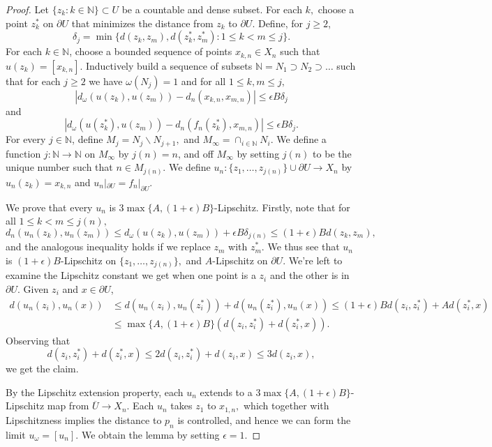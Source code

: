 \documentclass[10pt]{amsart}
\theoremstyle{definition}
\begin{document}
\begin{proof}
  Let $\{z_k:k\in \mathbb{N}\}\subset U$ be a countable and dense subset. For each $k,$ choose a point $z_k^*$ on $\partial U$ that minimizes the distance from $z_k$ to $\partial U$. Define, for $j\geq 2$, $$\delta_j = \min \{d(z_k,z_m), d(z_k^*,z_m^*):1\leq k < m \leq j\}.$$ For each $k\in \mathbb{N}$, choose a bounded sequence of points $x_{k,n}\in X_n$ such that $u(z_k)=[x_{k,n}]$. Inductively build a sequence of subsets $\mathbb{N}=N_1\supset N_2\supset\dots $ such that for each $j\geq 2$ we have $\omega(N_j)=1$ and for all $1\leq k,m\leq j,$ $$|d_\omega(u(z_k),u(z_m))-d_n(x_{k,n},x_{m,n})|\leq \epsilon B\delta_j$$ and $$|d_\omega(u(z_k^*),u(z_m))-d_n(f_n(z_k^*),x_{m,n})|\leq \epsilon B\delta_j.$$ For every $j\in\mathbb{N}$, define $M_j=N_j\backslash N_{j+1},$ and $M_\infty=\cap_{i\in\mathbb{N}}N_i.$ We define a function $j:\mathbb{N}\to \mathbb{N}$ on $M_\infty$ by $j(n)=n$, and off $M_\infty$ by setting $j(n)$ to be the unique number such that $n\in M_{j(n)}.$ We define $u_n:\{z_1,\dots, z_{j(n)}\}\cup\partial U\to X_n$ by $u_n(z_k)=x_{k,n}$ and $u_n|_{\partial U}=f_n|_{\partial U}$.
  
  We prove that every $u_n$ is $3\max\{A,(1+\epsilon)B\}$-Lipschitz. Firstly, note that for all $1\leq k <m\leq j(n),$ $$d_n(u_n(z_k),u_n(z_m))\leq d_\omega(u(z_k),u(z_m))+\epsilon B \delta_{j(n)}\leq (1+\epsilon)Bd(z_k,z_m),$$ and the analogous inequality holds if we replace $z_m$ with $z_m^*.$ We thus see that $u_n$ is $(1+\epsilon)B$-Lipschitz on $\{z_1,\dots, z_{j(n)}\},$ and $A$-Lipschitz on $\partial U$. We're left to examine the Lipschitz constant we get when one point is a $z_i$ and the other is in $\partial U$. Given $z_i$ and $x\in \partial U$, 
  \begin{align*}
      d(u_n(z_i),u_n(x))&\leq d(u_n(z_i),u_n(z_i^*))+d(u_n(z_i^*),u_n(x))\leq (1+\epsilon)Bd(z_i,z_i^*) + Ad(z_i^*,x) \\
      &\leq \max\{A,(1+\epsilon)B\} (d(z_i,z_i^*) + d(z_i^*,x)).
  \end{align*}
Observing that $$d(z_i,z_i^*)+d(z_i^*,x)\leq 2d(z_i,z_i^*) + d(z_i,x) \leq 3d(z_i,x),$$ we get the claim.
  
  
  By the Lipschitz extension property, each $u_n$ extends to a $3\max\{A,(1+\epsilon)B\}$-Lipschitz map from $\overline{U}\to X_n.$ Each $u_n$ takes $z_1$ to $x_{1,n},$ which together with Lipschitzness implies the distance to $p_n$ is controlled, and hence we can form the limit $u_\omega =[u_n].$ We obtain the lemma by setting $\epsilon=1.$
  \end{proof}
\end{document}
